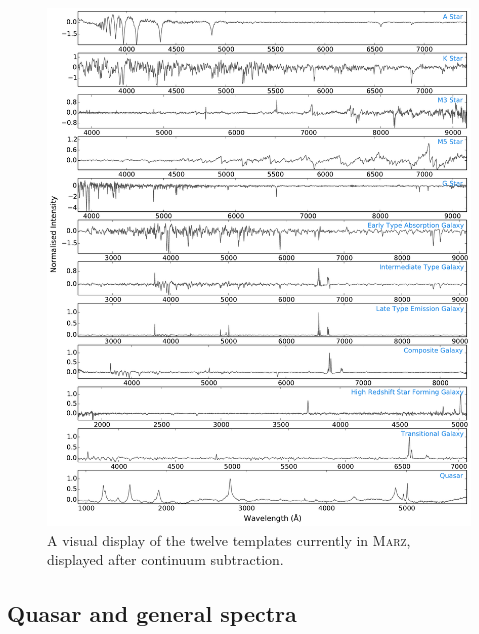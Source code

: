\documentclass[5p]{elsarticle}
\newcommand{\marz}{\textsc{Marz}}
\begin{document}
\begin{figure}[h]
\centering
\includegraphics[width=\textwidth]{templates.pdf}
\caption{A visual display of the twelve templates currently in \marz{}, displayed after continuum subtraction.}
\label{fig:templates}
\end{figure}

\subsection{Quasar and general spectra}
\end{document}
